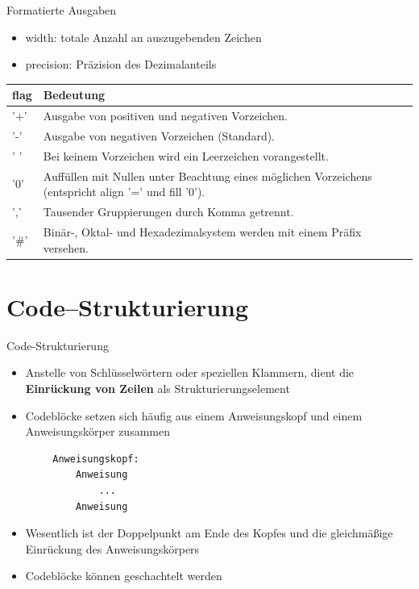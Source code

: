 \documentclass[utf8, smaller, c]{beamer}
\begin{document}
\begin{frame}{Formatierte Ausgaben}
	\vspace*{-2mm}
	\begin{itemize}
		\item width: totale Anzahl an auszugebenden Zeichen
		\item precision: Präzision des Dezimalanteils
	\end{itemize}
	\begin{tabular}{|p{0.9cm}|p{8.5cm}|} \hline
		\textbf{flag} & \textbf{Bedeutung} \\ \hline
		'+' & Ausgabe von positiven und negativen Vorzeichen. \\ \hline
		'-' & Ausgabe von negativen Vorzeichen (Standard). \\ \hline
		' ' & Bei keinem Vorzeichen wird ein Leerzeichen vorangestellt. \\ \hline
		'0' & Auffüllen mit Nullen unter Beachtung eines möglichen Vorzeichens (entspricht align '=' und fill '0'). \\ \hline
		',' & Tausender Gruppierungen durch Komma getrennt. \\ \hline
		'\#' & Binär-, Oktal- und Hexadezimalsystem werden mit einem Präfix versehen. \\ \hline
	\end{tabular}
\end{frame}

\section{Code--Strukturierung}
\begin{frame}[fragile]{Code-Strukturierung}
	\begin{itemize}
		\item Anstelle von Schlüsselwörtern oder speziellen Klammern, dient die \textbf{Einrückung von Zeilen} als Strukturierungselement
		\item Codeblöcke setzen sich häufig aus einem Anweisungskopf und einem Anweisungskörper zusammen
	\end{itemize}
	\begin{lstlisting}
		Anweisungskopf:
			Anweisung
				...
			Anweisung
	\end{lstlisting}
	\begin{itemize}
		\item Wesentlich ist der Doppelpunkt am Ende des Kopfes und die gleichmäßige Einrückung des Anweisungskörpers
		\item Codeblöcke können geschachtelt werden
	\end{itemize}
\end{frame}
\end{document}
